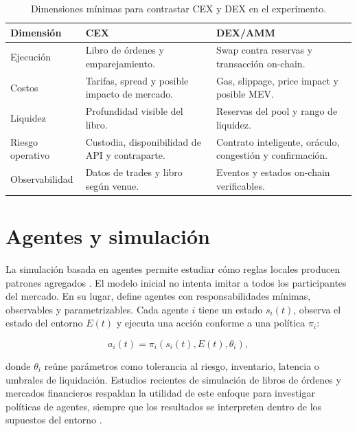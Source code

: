 \begin{table}[H]
\centering
\caption{Dimensiones mínimas para contrastar CEX y DEX en el experimento.}
\begin{tabularx}{\textwidth}{p{3cm}XX}
\toprule
\textbf{Dimensión} & \textbf{CEX} & \textbf{DEX/AMM} \\
\midrule
Ejecución & Libro de órdenes y emparejamiento. & Swap contra reservas y transacción on-chain. \\
Costos & Tarifas, spread y posible impacto de mercado. & Gas, slippage, price impact y posible MEV. \\
Liquidez & Profundidad visible del libro. & Reservas del pool y rango de liquidez. \\
Riesgo operativo & Custodia, disponibilidad de API y contraparte. & Contrato inteligente, oráculo, congestión y confirmación. \\
Observabilidad & Datos de trades y libro según venue. & Eventos y estados on-chain verificables. \\
\bottomrule
\end{tabularx}
\end{table}

\section{Agentes y simulación}

La simulación basada en agentes permite estudiar cómo reglas locales producen patrones agregados \cite{wooldridge2009multiagent}. El modelo inicial no intenta imitar a todos los participantes del mercado. En su lugar, define agentes con responsabilidades mínimas, observables y parametrizables. Cada agente $i$ tiene un estado $s_i(t)$, observa el estado del entorno $E(t)$ y ejecuta una acción conforme a una política $\pi_i$:

\begin{equation}
  a_i(t)=\pi_i\left(s_i(t),E(t),\theta_i\right),
\end{equation}

donde $\theta_i$ reúne parámetros como tolerancia al riesgo, inventario, latencia o umbrales de liquidación. Estudios recientes de simulación de libros de órdenes y mercados financieros respaldan la utilidad de este enfoque para investigar políticas de agentes, siempre que los resultados se interpreten dentro de los supuestos del entorno \cite{karpe2020marl,mascioli2024pymarketsim}.

